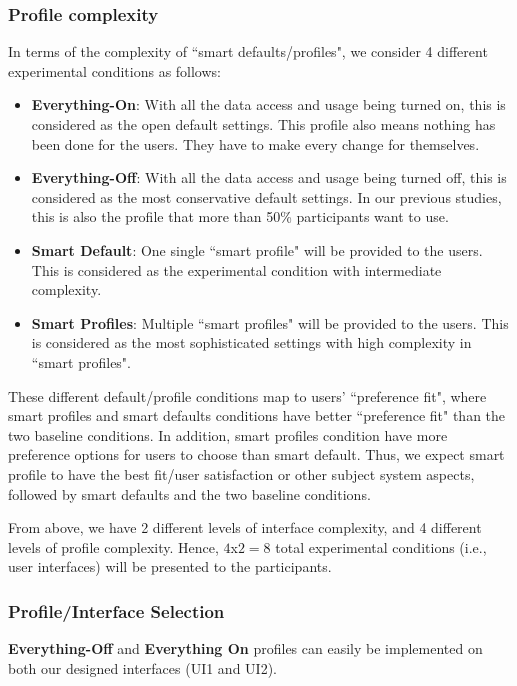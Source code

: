 \subsubsection{Profile complexity}
In terms of the complexity of ``smart defaults/profiles", we consider 4 different experimental conditions as follows:
\begin{itemize}
	\item \textbf{Everything-On}: With all the data access and usage being turned on, this is considered as the open default settings. This profile also means nothing has been done for the users. They have to make every change for themselves.
	\item \textbf{Everything-Off}: With all the data access and usage being turned off, this is considered as the most conservative default settings. In our previous studies, this is also the profile that more than 50\% participants want to use.
	\item \textbf{Smart Default}: One single ``smart profile" will be provided to the users. This is considered as the experimental condition with intermediate complexity.
	\item \textbf{Smart Profiles}: Multiple ``smart profiles" will be provided to the users. This is considered as the most sophisticated settings with high complexity in ``smart profiles".
\end{itemize}

These different default/profile conditions map to users' ``preference fit", where smart profiles and smart defaults conditions have better ``preference fit" than the two baseline conditions. In addition, smart profiles condition have more preference options for users to choose than smart default. Thus, we expect smart profile to have the best fit/user satisfaction or other subject system aspects, followed by smart defaults and the two baseline conditions.

From above, we have 2 different levels of interface complexity, and 4 different levels of profile complexity.
Hence, $4$x$2=8$ total experimental conditions (i.e., user interfaces) will be presented to the participants. 

\subsubsection{Profile/Interface Selection}
\textbf{Everything-Off} and \textbf{Everything On} profiles can easily be implemented on both our designed interfaces (UI1 and UI2).

